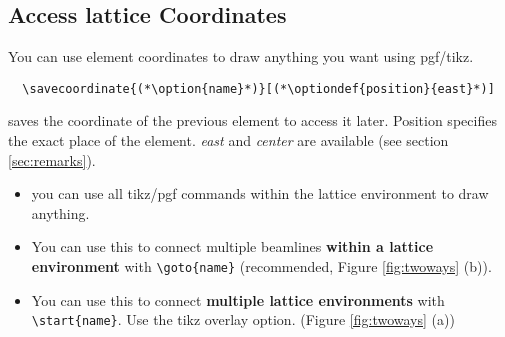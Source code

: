 \documentclass[a4paper]{scrartcl}
\newcommand{\option}[1]{{\color{blue}$\langle$\textit{#1}$\rangle$}}
\newcommand{\optiondef}[2]{{\color{green!50!black}$\langle$\textit{#1=#2}$\rangle$}}
\begin{document}
\subsection{Access lattice Coordinates}
\label{sec:coords}
You can use element coordinates to draw anything you want using pgf/tikz. 

\begin{lstlisting}
  \savecoordinate{(*\option{name}*)}[(*\optiondef{position}{east}*)]
\end{lstlisting}
saves the coordinate of the previous element to access it later. Position specifies the
exact place of the element. \textit{east} and \textit{center} are available (see section
\ref{sec:remarks}).

\begin{itemize}
\item you can use all tikz/pgf commands within the lattice environment to draw anything.
\item You can use this to connect multiple beamlines \textbf{within a lattice environment} with
  \lstinline+\goto{name}+ (recommended, Figure \ref{fig:twoways} (b)).
\item You can use this to connect \textbf{multiple lattice environments} with
  \lstinline+\start{name}+. Use the tikz overlay option. (Figure \ref{fig:twoways} (a))
\end{itemize}
\end{document}
